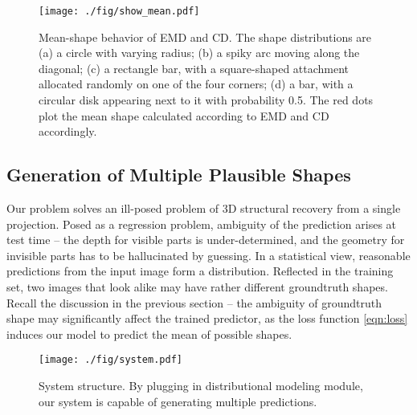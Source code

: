 \documentclass[10pt,twocolumn,letterpaper]{article}
\newcommand{\cmt}[2]{[#1: #2]}
\newcommand{\todo}[1]{\cmt{{\bf TODO}}{{\bf \color{blue} #1}}}
\begin{document}
\begin{figure}[t!]
\centering
\texttt{[image: ./fig/show\_mean.pdf]}
\caption{Mean-shape behavior of EMD and CD. The shape distributions are (a) a circle with varying radius; (b) a spiky arc moving along the diagonal; (c) a rectangle bar, with a square-shaped attachment allocated randomly on one of the four corners; (d) a bar, with a circular disk appearing next to it with probability 0.5. The red dots plot the mean shape calculated according to EMD and CD accordingly.}
\label{fig:mean}
\end{figure}\subsection{Generation of Multiple Plausible Shapes}\label{sec:method:gan}%

Our problem solves an ill-posed problem of 3D structural recovery from a single projection. Posed as a regression problem, ambiguity of the prediction arises at test time -- the depth for visible parts is under-determined, and the geometry for invisible parts has to be hallucinated by guessing. In a statistical view, reasonable predictions from the input image form a distribution.  Reflected in the training set, two images that look alike may have rather different groundtruth shapes. Recall the discussion in the previous section -- the ambiguity of groundtruth shape may significantly affect the trained predictor, as the loss function \eqref{eqn:loss} induces our model to predict the mean of possible shapes.  

\begin{figure}[t!]
  \centering
  \texttt{[image: ./fig/system.pdf]}
  \caption{System structure. By plugging in distributional modeling module, our system is capable of generating multiple predictions. }
  \label{fig:network}%
\end{figure}%
\end{document}

